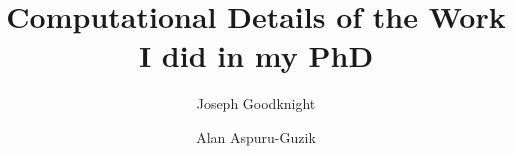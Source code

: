 



\title{Computational Details of the Work I did in my PhD}
\author{Joseph Goodknight}
\author{Alan Aspuru-Guzik}


\maketitle








